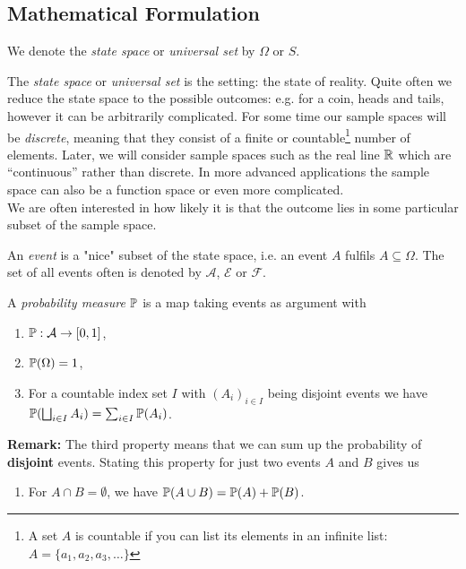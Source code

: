 \subsection{Mathematical Formulation}
\begin{defn}
We denote the \emph{state space} or \emph{universal set} by $\Omega$ or $S$. 
\end{defn}
The \emph{state space} or \emph{universal set} is the setting: the state of reality. Quite often we reduce the state space to the possible outcomes: e.g. for a coin, heads and tails, however it can be arbitrarily complicated. 
For some time our sample spaces will be \emph{discrete}, meaning that they consist of a finite or countable\footnote{A set $A$ is countable if you can list its elements in an infinite list: $A = \{ a_1, a_2, a_3, \dots\}$ } number of elements.  Later, we will consider sample spaces such as the real line ${\mathbb R}$ which are ``continuous'' rather than discrete. In more advanced applications the sample space can also be a function space or even more complicated. \\ \linebreak
We are often interested in how likely it is that the outcome lies in some
particular subset of the sample space.
\begin{defn}
An \emph{event} is a "nice" subset of the state space, i.e. an event $A$ fulfils $A \subseteq \Omega$.
The set of all events often is denoted by $\mathcal{A}$, $\mathcal{E}$ or $\mathcal{F}$.
\end{defn}
\begin{defn}
A \emph{probability measure} ${\mathbb P}$ is a map taking events as argument with
\begin{enumerate}
\item ${\mathbb P}: \mathcal{A} \to [0,1]$,
\item ${\mathbb P}(\Omega)=1$,
\item For a countable index set $I$ with $(A_i)_{i \in I}$ being disjoint events we have ${\mathbb P}( \bigsqcup_{i \in I} A_i) = \sum_{i\in I} {\mathbb P}(A_i)$.
\end{enumerate}
\end{defn}
\noindent\textbf{Remark:} The third property means that we can sum up the probability of \textbf{disjoint} events. Stating this property for just two events $A$ and $B$ gives us
\begin{enumerate}[\hspace{5mm}3.]
\item For $A \cap B = \emptyset$, we have ${\mathbb P}(A \cup B) = {\mathbb P}(A) + {\mathbb P}(B)$.
\end{enumerate}




